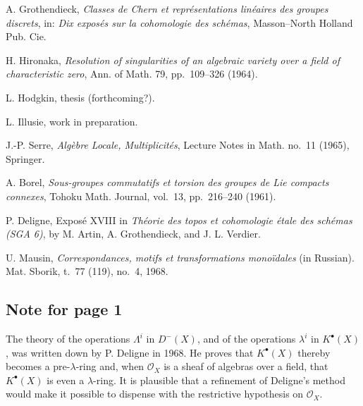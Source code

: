 \begin{enumerate}[label={[\arabic*]},leftmargin=3.2em]
\item A. Grothendieck,
  \emph{Classes de Chern et repr\'esentations lin\'eaires des groupes
  discrets}, in: \emph{Dix expos\'es sur la cohomologie des sch\'emas},
  Masson--North Holland Pub. Cie.

\item H. Hironaka,
  \emph{Resolution of singularities of an algebraic variety over a field of
  characteristic zero}, Ann. of Math. 79, pp.~109--326 (1964).

\item L. Hodgkin, thesis (forthcoming?).

\item L. Illusie, work in preparation.

\item J.-P. Serre, \emph{Alg\`ebre Locale, Multiplicit\'es},
  Lecture Notes in Math. no.~11 (1965), Springer.

\item A. Borel,
  \emph{Sous-groupes commutatifs et torsion des groupes de Lie compacts
  connexes}, Tohoku Math. Journal, vol.~13, pp.~216--240 (1961).

\item[{[16]}(*)] P. Deligne, Expos\'e XVIII in
  \emph{Th\'eorie des topos et cohomologie \'etale des sch\'emas (SGA 6)},
  by M. Artin, A. Grothendieck, and J. L. Verdier.

\item[{[17]}(*)] U. Mausin,
  \emph{Correspondances, motifs et transformations mono\"idales}
  (in Russian). Mat. Sborik, t.~77 (119), no.~4, 1968.
\end{enumerate}


\subsection*{Note for page 1}

The theory of the operations $\Lambda^i$ in $D^{-}(X)$, and of the
operations $\lambda^i$ in $K^\bullet(X)$, was written down by P. Deligne in
1968. He proves that $K^\bullet(X)$ thereby becomes a pre-$\lambda$-ring and,
when $\mathcal O_X$ is a sheaf of algebras over a field, that
$K^\bullet(X)$ is even a $\lambda$-ring. It is plausible that a refinement
of Deligne's method would make it possible to dispense with the restrictive
hypothesis on $\mathcal O_X$.

